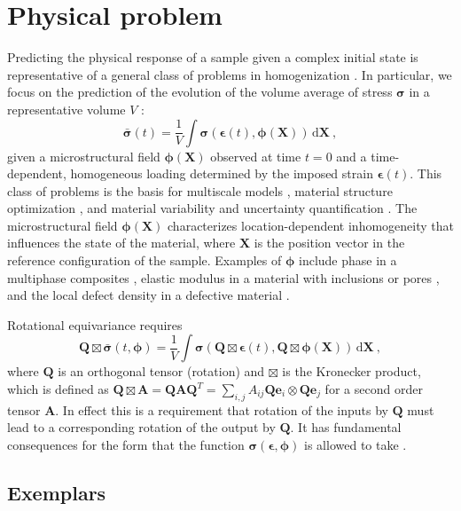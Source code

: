 \documentclass[12pt,reqno]{article}
\newcommand{\ADD}[1]{{#1}}
\newcommand{\eb}{\mathbf{e}}
\newcommand{\Ab}{\mathbf{A}}
\newcommand{\Qb}{\mathbf{Q}}
\newcommand{\Xb}{\mathbf{X}}
\newcommand{\epsilonb}{{\boldsymbol{\epsilon}}}
\newcommand{\sigmab}{{\boldsymbol{\sigma}}}
\newcommand{\phib}{{\boldsymbol{\phi}}}
\begin{document}
\section{Physical problem} \label{sec:problem}
Predicting the physical response of a sample given a complex initial state is representative of a general class of problems in homogenization \cite{mura2013micromechanics,nemat2013micromechanics}.
In particular, we focus on the prediction of the evolution of the volume average of stress $\sigmab$ in a representative volume $V$ :
\begin{equation} \label{eq:problem}
\bar{\sigmab}(t) = \frac{1}{V} \int \sigmab\left( \epsilonb(t), \phib(\Xb) \right) \, \mathrm{d}\Xb \ ,
\end{equation}
given a microstructural field $\phib(\Xb)$ observed at time $t=0$ and a time-dependent, homogeneous loading determined by the imposed strain $\epsilonb(t)$.
This class of problems is the basis for multiscale models \cite{trovalusci2009genesis}, material structure optimization \cite{le2012material}, and material variability and uncertainty quantification \cite{khalil2021modeling}.
The microstructural field $\phib(\Xb)$ characterizes location-dependent inhomogeneity that influences the state of the material,  where $\Xb$ is the position vector in the reference configuration of the sample.
Examples of $\phib$ include phase in a multiphase composites \cite{bouquerel2006microstructure}, elastic modulus in a material with inclusions \cite{roduit2009stiffness} or pores \cite{heckman2020automated}, and the local defect density in a defective material \cite{vcekada2007sem}.

Rotational equivariance requires
\begin{equation} \label{eq:invariance}
\Qb \boxtimes \bar{\sigmab}(t,\phib) = \frac{1}{V} \int \sigmab\left( \Qb \boxtimes \epsilonb(t), \Qb \boxtimes \phib(\Xb) \right) \, \mathrm{d}\Xb \ ,
\end{equation}
where $\Qb$ is an orthogonal tensor (rotation) and $\boxtimes$ is the Kronecker product, which is defined as $\Qb \boxtimes \Ab = \Qb \Ab \Qb^T = \sum_{i,j} A_{ij} \Qb \eb_i \otimes \Qb \eb_j$  for a second order tensor $\Ab$.
In effect this is a requirement that rotation of the inputs by $\Qb$ must lead to a corresponding rotation of the output by $\Qb$.
It has fundamental consequences for the form that the function $\sigmab(\epsilonb,\phib)$ is allowed to take \cite{silhavy2013mechanics,jones2018machine}.

\subsection{\ADD{Exemplars}}\label{sec:exemplar}
\end{document}
